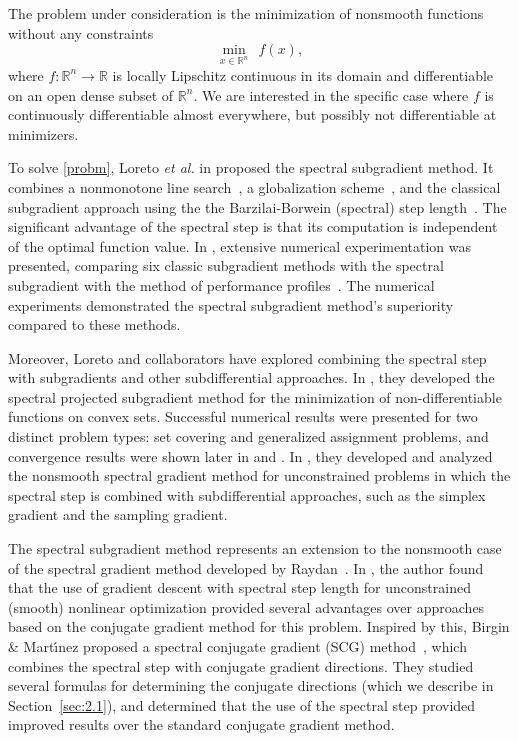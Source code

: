 \documentclass[]{interact}
\newcommand{\Real}{\mathbb{R}}
\theoremstyle{plain}%
\theoremstyle{definition}
\theoremstyle{remark}
\begin{document}
{The problem under consideration is the minimization of nonsmooth functions without any constraints
\begin{equation} \label{probm}
  \min_{x\in\Real^{n}}~~ f(x),
   \end{equation}
  where $f: \Real^{n} \rightarrow \Real$ is locally Lipschitz continuous in its domain and differentiable  on an open dense subset of $ \Real^n$. We are interested in the specific case where $f$ is continuously differentiable almost everywhere, but possibly not differentiable at minimizers.}


To solve \eqref{probm}, Loreto {\it et al.} in \cite{Loreto:19} proposed the spectral subgradient method. {It combines a nonmonotone line search~\cite{GriLaLu:86}, a globalization scheme~\cite{wmr2:05}}, and the classical subgradient approach using the the Barzilai-Borwein (spectral) step length~\cite{BarBor:88}. {The significant advantage of the spectral step is that its computation is independent of the optimal function value}. In \cite{Loreto:19}, extensive numerical experimentation was presented, {comparing six classic subgradient methods with the spectral subgradient  with the method of performance profiles~\cite{Dolan02}}. The numerical experiments demonstrated the spectral subgradient method's superiority compared to these methods.

Moreover, Loreto and collaborators have explored combining the spectral step with subgradients and other subdifferential approaches. In \cite{Loreto:07}, they developed the spectral projected subgradient method for the minimization of non-differentiable functions on convex sets. {Successful numerical results were presented for two distinct problem types: set covering and generalized assignment problems, and convergence} results were shown later in \cite{Loreto:15} and \cite{Loreto:16}. In \cite{Loreto:17}, they developed and analyzed the nonsmooth spectral gradient method for unconstrained problems in which the spectral step is combined with subdifferential approaches, such as the simplex gradient and the sampling gradient.

The spectral subgradient method represents an extension to the nonsmooth case of the spectral gradient method developed by Raydan~\cite{Raydan:93,Raydan:97}.  In \cite{Raydan:97}, the author found that the use of gradient descent with spectral step length for unconstrained (smooth) nonlinear optimization provided several advantages over approaches based on the conjugate gradient method for this problem. Inspired by this, Birgin \& Mart\'{\i}nez proposed a spectral conjugate gradient (SCG) method~\cite{Bm01}, which combines the spectral step with conjugate gradient directions. They studied several formulas for determining the conjugate directions (which we describe in Section~\ref{sec:2.1}), and determined that the use of the spectral step provided improved results over the standard conjugate gradient method.
\end{document}
